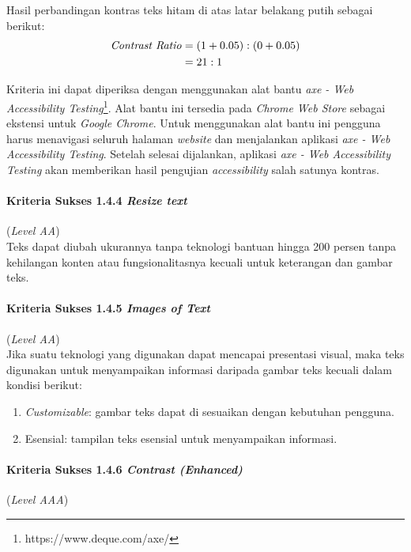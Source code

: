 Hasil perbandingan kontras teks hitam di atas latar belakang putih sebagai berikut:
\begin{align*}
\text{\textit{Contrast Ratio}} &= (1 + 0.05) : (0 + 0.05) \\
&= 21 : 1
\end{align*}

Kriteria ini dapat diperiksa dengan menggunakan alat bantu \textit{axe - Web Accessibility Testing}\footnote{https://www.deque.com/axe/}. Alat bantu ini tersedia pada \textit{Chrome Web Store} sebagai ekstensi untuk \textit{Google Chrome}. Untuk menggunakan alat bantu ini pengguna harus menavigasi seluruh halaman \textit{website} dan menjalankan aplikasi \textit{axe - Web Accessibility Testing}. Setelah selesai dijalankan, aplikasi \textit{axe - Web Accessibility Testing} akan memberikan hasil pengujian \textit{accessibility} salah satunya kontras.

\paragraph{Kriteria Sukses 1.4.4 \textit{Resize text}}
\label{subsec:kriteria_1.4.4}
(\textit{Level AA}) \\

Teks dapat diubah ukurannya tanpa teknologi bantuan hingga 200 persen tanpa kehilangan konten atau fungsionalitasnya kecuali untuk keterangan dan gambar teks.

\paragraph{Kriteria Sukses 1.4.5 \textit{Images of Text}}
\label{subsec:kriteria_1.4.5}
(\textit{Level AA}) \\

Jika suatu teknologi yang digunakan dapat mencapai presentasi visual, maka teks digunakan untuk menyampaikan informasi daripada gambar teks kecuali dalam kondisi berikut:

\begin{enumerate}
	\item \textit{Customizable}: gambar teks dapat di sesuaikan dengan kebutuhan pengguna.
	\item Esensial: tampilan teks esensial untuk menyampaikan informasi.
\end{enumerate}

\paragraph{Kriteria Sukses 1.4.6 \textit{Contrast (Enhanced)}}
\label{subsec:kriteria_1.4.6}
(\textit{Level AAA}) \\

